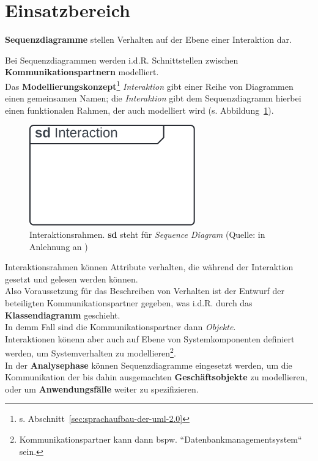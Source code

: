 \section{Einsatzbereich}

\begin{tcolorbox}
    \textbf{Sequenzdiagramme} stellen Verhalten auf der Ebene einer Interaktion dar.
\end{tcolorbox}

\noindent
Bei Sequenzdiagrammen werden i.d.R. Schnittstellen zwischen \textbf{Kommunikationspartnern} modelliert.\\

\noindent
Das \textbf{Modellierungskonzept}\footnote{
s. Abschnitt~\ref{sec:sprachaufbau-der-uml-2.0}
} \textit{Interaktion} gibt einer Reihe von Diagrammen einen gemeinsamen Namen; die \textit{Interaktion} gibt dem Sequenzdiagramm hierbei einen funktionalen Rahmen, der auch modelliert wird (s. Abbildung~\ref{fig:interaktionsrahmen}).\\

\begin{figure}
    \centering
    \includegraphics[scale=0.5]{part three/Sequenzdiagramme/img/interaktionsrahmen}
    \caption{Interaktionsrahmen. \textbf{sd} steht für \textit{Sequence Diagram} (Quelle: in Anlehnung an \cite[596]{UML17})}
    \label{fig:interaktionsrahmen}
\end{figure}

\noindent
Interaktionsrahmen können Attribute verhalten, die während der Interaktion gesetzt und gelesen werden können.\\

\noindent
Also Voraussetzung für das Beschreiben von Verhalten ist der Entwurf der beteiligten Kommunikationspartner gegeben, was i.d.R. durch das \textbf{Klassendiagramm} geschieht.\\
In demm Fall sind die Kommunikationspartner dann \textit{Objekte}.\\

\noindent
Interaktionen könenn aber auch auf Ebene von Systemkomponenten definiert werden, um Systemverhalten zu modellieren\footnote{
Kommunikationspartner kann dann bspw. ``Datenbankmanagementsystem`` sein.
}.\\

\noindent
In der \textbf{Analysephase} können Sequenzdiagramme eingesetzt werden, um die Kommunikation der bis dahin ausgemachten \textbf{Geschäftsobjekte} zu modellieren, oder um \textbf{Anwendungsfälle} weiter zu spezifizieren.